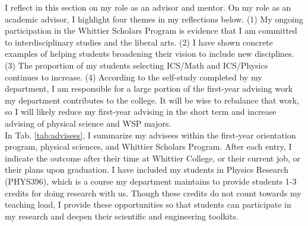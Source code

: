 \documentclass[../../main.tex]{subfiles}
\begin{document}
\label{sec:advising_mentoring}

I reflect in this section on my role as an advisor and mentor.  On my role as an academic advisor, I highlight four themes in my reflections below.  (1) My ongoing participation in the Whittier Scholars Program is evidence that I am committed to interdisciplinary studies and the liberal arts.  (2) I have shown concrete examples of helping students broadening their vision to include new disciplines.  (3) The proportion of my students selecting ICS/Math and ICS/Physics continues to increase.  (4) According to the self-study completed by my department, I am responsible for a large portion of the first-year advising work my department contributes to the college.  It will be wise to rebalance that work, so I will likely reduce my first-year advising in the short term and increase advising of physical science and WSP majors.
\\
\vspace{0.15cm}
In Tab. \ref{tab:advisees}, I summarize my advisees within the first-year orientation program, physical sciences, and Whittier Scholars Program.  After each entry, I indicate the outcome after their time at Whittier College, or their current job, or their plans upon graduation.  I have included my students in Physics Research (PHYS396), which is a course my department maintains to provide students 1-3 credits for doing research with us.  Though these credits do not count towards my teaching load, I provide these opportunities so that students can participate in my research and deepen their scientific and engineering toolkits.
\end{document}
